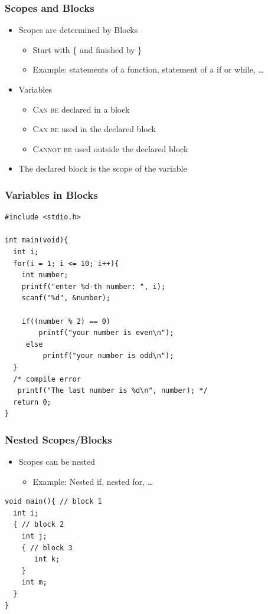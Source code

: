 \documentclass{../c-lecture}
\begin{document}
\begin{frame}
  \frametitle{Scopes and Blocks}
  \begin{itemize}
    \item Scopes are determined by Blocks
    \begin{itemize}
      \item Start with \{ and finished by \}
      \item
        Example: statements of a function, statement of a if or while, \ldots
    \end{itemize}
    \item Variables
    \begin{itemize}
      \item \textsc{\color{Orange} Can be} declared in a block
      \item \textsc{\color{Orange} Can be} used in the declared block
      \item
        \textsc{\color{RubineRed} Cannot be} used outside the declared block
    \end{itemize}
    \item The declared block is the scope of the variable
  \end{itemize}
\end{frame}

\begin{frame}[fragile]
  \frametitle{Variables in Blocks}
  \scriptsize
  \begin{verbatim}
#include <stdio.h>

int main(void){
  int i;
  for(i = 1; i <= 10; i++){
    int number;
    printf("enter %d-th number: ", i);
    scanf("%d", &number);

    if((number % 2) == 0)
        printf("your number is even\n");
     else
         printf("your number is odd\n");
  }
  /* compile error
   printf("The last number is %d\n", number); */
  return 0;
}
  \end{verbatim}
\end{frame}

\begin{frame}[fragile]
  \frametitle{Nested Scopes/Blocks}
  \begin{itemize}
    \item Scopes can be nested
    \begin{itemize}
      \item Example: Nested if, nested for, \ldots
    \end{itemize}
  \end{itemize}
  \scriptsize
  \begin{verbatim}
void main(){ // block 1
  int i;
  { // block 2
    int j;
    { // block 3
       int k;
    }
    int m;
  }
}
  \end{verbatim}
\end{frame}
\end{document}
